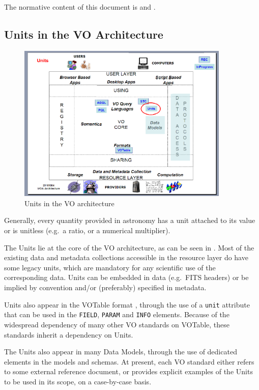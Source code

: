 \documentclass[11pt,notitlepage,onecolumn]{ivoa}
\def\eg{e.g.~}
\begin{document}
The normative content of this document is  and .

\subsection{Units in the VO Architecture}

\begin{figure}[htbp]
  \centerline{\includegraphics[width=0.9\textwidth]{unitsInIVOA.png}}
  \caption{Units in the VO architecture}
  \label{fig:architecture}
\end{figure}

Generally, every quantity provided in astronomy has a unit attached to
its value or is unitless (\eg a ratio, or a numerical multiplier).  

The Units lie at the core of the VO architecture, as can be seen in .
Most of the existing data and metadata collections accessible in the resource
layer do have some legacy units, which are mandatory for any scientific use of
the corresponding data.  Units can be embedded in data (\eg FITS headers) or be
implied by convention and/or (preferably) specified in metadata.


Units also appear in the VOTable format \citep{ochsenbein11}, through the use
of a {\tt unit} attribute that can be used in the {\tt FIELD}, {\tt PARAM} and {\tt INFO} 
elements. Because of the widespread dependency of many other VO standards on VOTable,
these standards inherit a dependency on Units.

The Units also appear in many Data Models, through the use of dedicated elements in
the models and schemas.
At present, each VO standard either refers to some external reference document, or 
provides explicit examples of the Units to be used in its scope, on a case-by-case
basis.
\end{document}
